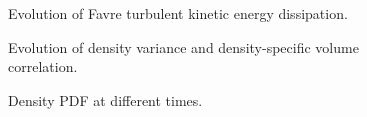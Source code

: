 \documentclass[11pt]{article}
\begin{document}
\begin{figure}[h]
\caption{Evolution of Favre turbulent kinetic energy dissipation.}
\label{figure4}
\end{figure}

\begin{figure}[h]
\caption{Evolution of density variance and density-specific volume 
correlation.}
\label{figure5}
\end{figure}


\begin{figure}[h]
\caption{Density PDF at different times.}
\label{figure6}
\end{figure}
\end{document}
